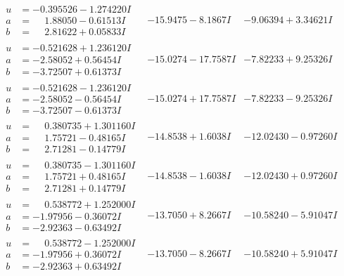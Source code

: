 \documentclass[1p]{elsarticle_modified}
\theoremstyle{definition}
\begin{document}
$$\begin{array}{c|c|c}
\begin{aligned}
u &= -0.395526 - 1.274220 I \\
a &= \phantom{-}1.88050 - 0.61513 I \\
b &= \phantom{-}2.81622 + 0.05833 I\end{aligned}
 & -15.9475 - 8.1867 I & -9.06394 + 3.34621 I \\ \hline\begin{aligned}
u &= -0.521628 + 1.236120 I \\
a &= -2.58052 + 0.56454 I \\
b &= -3.72507 + 0.61373 I\end{aligned}
 & -15.0274 - 17.7587 I & -7.82233 + 9.25326 I \\ \hline\begin{aligned}
u &= -0.521628 - 1.236120 I \\
a &= -2.58052 - 0.56454 I \\
b &= -3.72507 - 0.61373 I\end{aligned}
 & -15.0274 + 17.7587 I & -7.82233 - 9.25326 I \\ \hline\begin{aligned}
u &= \phantom{-}0.380735 + 1.301160 I \\
a &= \phantom{-}1.75721 - 0.48165 I \\
b &= \phantom{-}2.71281 - 0.14779 I\end{aligned}
 & -14.8538 + 1.6038 I & -12.02430 - 0.97260 I \\ \hline\begin{aligned}
u &= \phantom{-}0.380735 - 1.301160 I \\
a &= \phantom{-}1.75721 + 0.48165 I \\
b &= \phantom{-}2.71281 + 0.14779 I\end{aligned}
 & -14.8538 - 1.6038 I & -12.02430 + 0.97260 I \\ \hline\begin{aligned}
u &= \phantom{-}0.538772 + 1.252000 I \\
a &= -1.97956 - 0.36072 I \\
b &= -2.92363 - 0.63492 I\end{aligned}
 & -13.7050 + 8.2667 I & -10.58240 - 5.91047 I \\ \hline\begin{aligned}
u &= \phantom{-}0.538772 - 1.252000 I \\
a &= -1.97956 + 0.36072 I \\
b &= -2.92363 + 0.63492 I\end{aligned}
 & -13.7050 - 8.2667 I & -10.58240 + 5.91047 I \\ \hline\begin{aligned}

\end{aligned}
\end{array}$$
\end{document}
